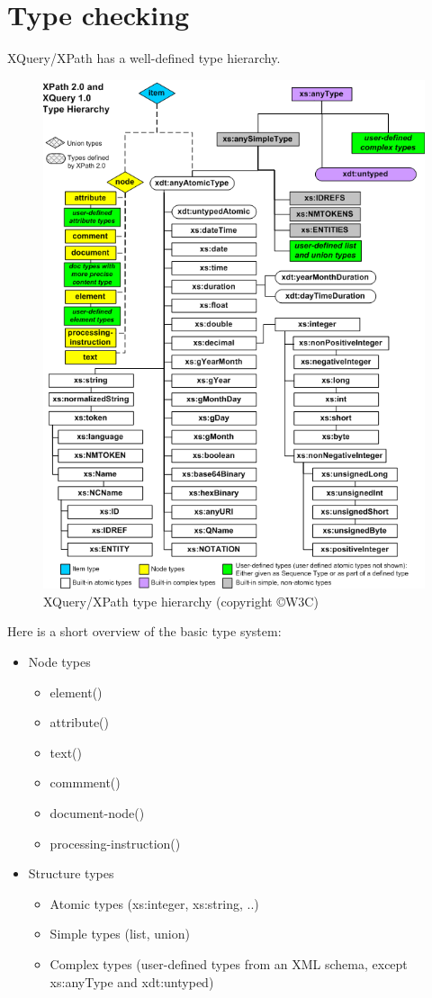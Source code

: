 \section{Type checking}
XQuery/XPath has a well-defined type hierarchy.
\begin{figure}[h!]
  \centering
    \includegraphics[scale=0.5]{img/xpathtypehierarchy}
  \caption{XQuery/XPath type hierarchy \cite{w3c04} (copyright
  \copyright W3C)}
\end{figure}
Here is a short overview of the basic type system:
\begin{itemize}
  \item Node types
    \begin{itemize}
      \item element()
      \item attribute()
      \item text()
      \item commment()
      \item document-node()
      \item processing-instruction()
    \end{itemize}
  \item Structure types
    \begin{itemize}
      \item Atomic types (xs:integer, xs:string, ..)
      \item Simple types (list, union)
      \item Complex types (user-defined types from an XML schema, except
      xs:anyType and xdt:untyped)
    \end{itemize}
\end{itemize}

